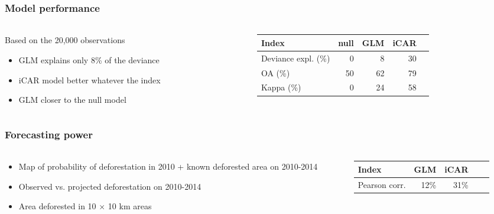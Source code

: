 \documentclass[slidetop,10pt,dvipsnames,leqno,fleqn]{beamer} %
\begin{document}
\begin{frame}
  \frametitle{Model performance}
  \framesubtitle{}
  \begin{columns}
    \begin{column}{0.5\textwidth}
      \begin{block}{Based on the 20,000 observations}
        \begin{itemize}
        \item GLM explains only 8\% of the deviance
        \item iCAR model better whatever the index
        \item GLM closer to the null model
        \end{itemize}
      \end{block}
    \end{column}
    \begin{column}{0.5\textwidth}
    {\small
      \begin{tabular}{@{}lrrrr@{}}
        \toprule
        Index & null & GLM & iCAR \\
        \midrule
        Deviance expl. (\%) & 0 & 8 & 30 \\
        OA (\%) & 50 & 62 & 79 \\
        Kappa (\%) & 0 & 24 & 58 \\
        \bottomrule
      \end{tabular}
    }
    \end{column}
  \end{columns}
\end{frame}

\begin{frame}
  \frametitle{Forecasting power}
  \framesubtitle{}
  \begin{columns}
    \begin{column}{0.6\textwidth}
      \begin{block}{}
        \begin{itemize}
        \item Map of probability of deforestation in 2010 + known deforested area on 2010-2014
        \item Observed vs. projected deforestation on 2010-2014
        \item Area deforested in 10 $\times$ 10 km areas
        \end{itemize}
      \end{block}
    \end{column}
    \begin{column}{0.5\textwidth}
    {\small
      \begin{tabular}{@{}lrrrr@{}}
        \toprule
        Index & GLM & iCAR \\
        \midrule
        Pearson corr. & 12\% & 31\% \\
        \bottomrule
      \end{tabular}
    }
    \end{column}
  \end{columns}
\end{frame}
\end{document}
